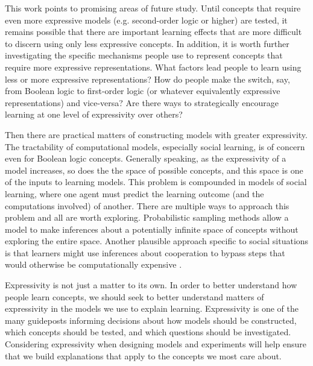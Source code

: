 \documentclass[doc,floatsintext]{apa6}
\begin{document}
This work points to promising areas of future study. Until concepts that require even more expressive models (e.g. second-order logic or higher) are tested, it remains possible that there are important learning effects that are more difficult to discern using only less expressive concepts.
In addition, it is worth further investigating the specific mechanisms people use to represent concepts that require more expressive representations.
What factors lead people to learn using less or more expressive representations? How do people make the switch, say, from Boolean logic to first-order logic (or whatever equivalently expressive representations) and vice-versa?
Are there ways to strategically encourage learning at one level of expressivity over others?

Then there are practical matters of constructing models with greater expressivity. The tractability of computational models, especially social learning, is of concern \citep{bealr2009,vanrooij2011,searcys2016} even for Boolean logic concepts.
Generally speaking, as the expressivity of a model increases, so does the 
the space of possible concepts, and this space is one of the inputs to learning models.
This problem is compounded in models of social learning, where one agent must predict the learning outcome (and the computations involved) of another.
There are multiple ways to approach this problem and all are worth exploring.
Probabilistic sampling methods \citep{goodmantfg2008,piantadositg2015} allow a model to make inferences about a potentially infinite space of concepts without exploring the entire space.
Another plausible approach specific to social situations is that learners might use inferences about cooperation to bypass steps that would otherwise be computationally expensive \citep{searcys2016}.

Expressivity is not just a matter to its own.
In order to better understand how people learn concepts, we should seek to better understand matters of expressivity in the models we use to explain learning.
Expressivity is one of the many guideposts informing decisions about how models should be constructed, which concepts should be tested, and which questions should be investigated.
Considering expressivity when designing models and experiments will help ensure that we build explanations that apply to the concepts we most care about. 

\end{document}

